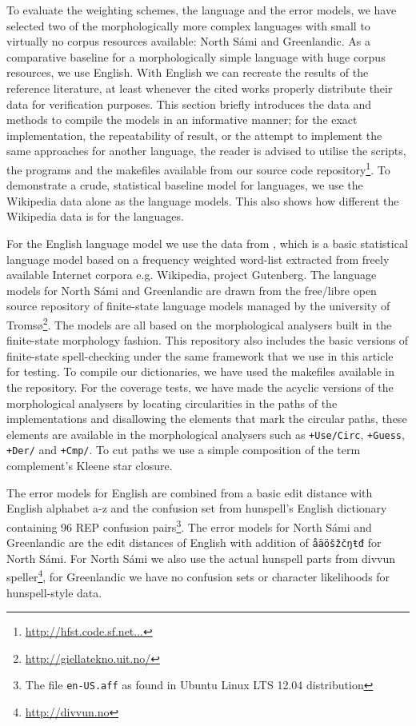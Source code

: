 \documentclass[a4paper,12pt]{article}
\begin{document}
To evaluate the weighting schemes, the language and the error models, we have
selected two of the morphologically more complex languages with small to
virtually no corpus resources available: North Sámi and Greenlandic.  As a
comparative baseline for a morphologically simple language with huge corpus
resources, we use English.  With English we can recreate the results of the
reference literature, at least whenever the cited works properly distribute
their data for verification purposes. This section briefly
introduces the data and methods to compile the models in an informative manner;
for the exact implementation, the repeatability of result, or the attempt to
implement the same approaches for another language, the reader is advised to
utilise the scripts, the programs and the makefiles available from our source
code repository\footnote{\url{http://hfst.code.sf.net...}}.  To demonstrate a
crude, statistical baseline model for languages, we use the Wikipedia data
alone as the language models. This also shows how different the Wikipedia
data is for the languages.

For the English language model we use the data from
\cite{norvig/2010,pirinen2012effects}, which is a basic statistical language
model based on a frequency weighted word-list extracted from freely available
Internet corpora e.g. Wikipedia, project Gutenberg.  The language models for
North Sámi and Greenlandic are drawn from the free/libre open source repository
of finite-state language models managed by the university of
Tromsø\footnote{\url{http://giellatekno.uit.no/}}. The models are all based on
the morphological analysers built in the finite-state morphology
\cite[]{beesley2003finite} fashion. This repository also includes the basic
versions of finite-state spell-checking under the same framework that we use in
this article for testing. To compile our dictionaries, we have used the
makefiles available in the repository.  For the coverage tests, we have made
the acyclic versions of the morphological analysers by locating circularities
in the paths of the implementations and disallowing the elements that mark the
circular paths, these elements are available in the morphological analysers
such as \texttt{+Use/Circ}, \texttt{+Guess}, \texttt{+Der/} and \texttt{+Cmp/}.
To cut paths we use a simple composition of the term complement's Kleene star
closure.

The error models for English are combined from a basic edit distance with
English alphabet a-z and the confusion set from hunspell's
English dictionary containing 96 REP confusion pairs\footnote{The file
\texttt{en-US.aff} as found in Ubuntu Linux LTS 12.04 distribution}. The error
models for North Sámi and Greenlandic are the edit distances of English with
addition of \texttt{åäöšžčŋŧđ} for North Sámi. For North Sámi we also use the
actual hunspell parts from divvun speller\footnote{\url{http://divvun.no}}, for
Greenlandic we have no confusion sets or character likelihoods for
hunspell-style data.
\end{document}

